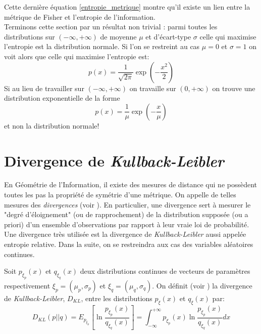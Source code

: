 \documentclass[11pt, letterpaper]{article}
\begin{document}
	Cette dernière équation \eqref{entropie_metrique} montre qu'il existe un lien entre la métrique de Fisher et l'entropie de l'information.\\
	
	Terminons cette section par un résultat non trivial \cite[Théorème 6.5.1]{calin2014geometric}: parmi toutes les distributions sur $(-\infty, +\infty)$ de moyenne $\mu$ et d'écart-type $\sigma$ celle qui maximise l'entropie est la distribution normale. Si l'on se restreint au cas $\mu=0$ et $\sigma=1$ on voit alors que celle qui maximise l'entropie est:
	\begin{equation*}
	    p(x)=\frac{1}{\sqrt{2\pi}}\exp(-\frac{x^2}{2})
	\end{equation*}
	Si au lieu de travailler sur $(-\infty, +\infty)$ on travaille sur $(0, +\infty)$ on trouve une distribution exponentielle de la forme 
	\begin{equation*}
	    p(x)=\frac{1}{\mu}\exp(-\frac{x}{\mu})
	\end{equation*}
	et non la distribution normale!\\
	
	\section{Divergence de \textit{Kullback-Leibler}}
	En Géométrie de l'Information, il existe des mesures de distance qui ne possèdent toutes les pas la propriété de symétrie d'une métrique. On appelle de telles mesures des \textit{divergences} (voir \cite[Section 3.2]{amari2000nethods}). En particulier, une divergence sert à mesurer le "degré d'éloignement" (ou de rapprochement) de la distribution supposée (ou a priori) d'un ensemble d'observations par rapport à leur vraie loi de probabilité. Une divergence très utilisée est la divergence de \textit{Kullback-Leibler} aussi appelée entropie relative. Dans la suite, on se restreindra aux cas des variables aléatoires continues.
	
	Soit $p_{\xi_p}(x)$ et $q_{\xi_q}(x)$ deux distributions continues de vecteurs de paramètres respectivement $\xi_p=(\mu_p, \sigma_p)$ et $\xi_q=(\mu_q, \sigma_q)$. On définit (voir \cite{calin2014geometric}) la divergence de \textit{Kullback-Leibler}, $D_{KL}$, entre les distributions $p_{\xi}(x)$ et $q_{\xi}(x)$ par:
	\begin{equation*}
	    D_{KL}(p||q)=E_{p_{\xi_p}}\left[\ln\frac{p_{\xi_p}(x)}{q_{\xi_q}(x)}\right]=\int_{-\infty}^{+\infty}p_{\xi_p}(x)\ln\frac{p_{\xi_p}(x)}{q_{\xi_q}(x)}dx
	\end{equation*}\\
	   
\end{document}
